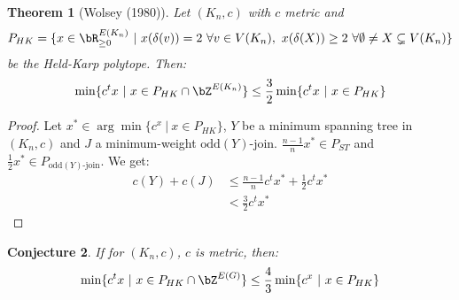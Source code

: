 \documentclass[11pt, a4paper]{article}
\newcommand{\set}[1]{\{#1\}}
\newtheorem{theorem}{Theorem}[section]
\newtheorem{conjecture}[theorem]{Conjecture}
\theoremstyle{remark}
\theoremstyle{definition}
\begin{document}
\begin{theorem}[Wolsey (1980)]
	Let $(K_n,c)$ with $c$ metric and
	\[P_{HK}=\set{x\in\bR^{E(K_n)}_{\geq0}\ |\ x(\delta(v))=2\ \forall v\in V(K_n),
			\ x(\delta(X))\geq 2\ \forall \emptyset\neq X\subsetneq V(K_n)}\]
	be the Held-Karp polytope. Then:
	\[\min\set{c^tx\ |\ x\in P_{HK}\cap\bZ^{E(K_n)}}\leq \frac{3}{2}
		\min\set{c^tx\ |\ x\in P_{HK}}\]
\end{theorem}
\begin{proof}
	Let $x^*\in \arg\min\set{c^x\ |\ x\in P_{HK}}$, $Y$ be a minimum
	spanning tree in $(K_n,c)$ and $J$ a minimum-weight $\mathrm{odd}(Y)$-join.
	$\frac{n-1}{n}x^*\in P_{ST}$ and $\frac{1}{2}x^*\in P_{\mathrm{odd}(Y)\text{-join}}$.
	We get:
	\begin{align*}
		c(Y)+c(J) & \leq \frac{n-1}{n}c^tx^*+\frac{1}{2}c^tx^* \\
		          & <\frac{3}{2}c^tx^*
	\end{align*}
\end{proof}

\begin{conjecture}
	If for $(K_n,c)$, $c$ is metric, then:
	\[\min\set{c^tx\ |\ x\in P_{HK}\cap\bZ^{E(G)}}\leq \frac{4}{3}\min\set{c^x\ |\ x\in P_{HK}}\]
\end{conjecture}

\end{document}
